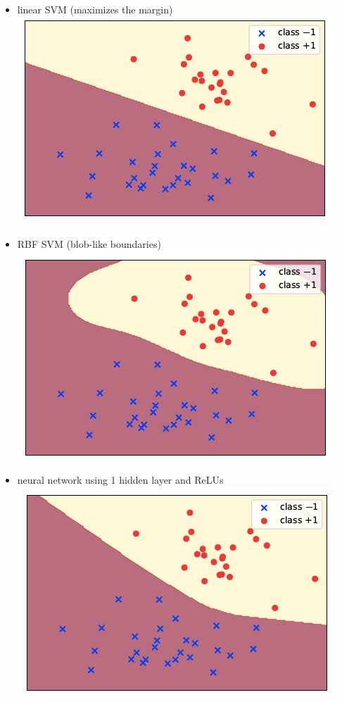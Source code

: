 \documentclass[10pt,landscape,a4paper]{article}
\begin{document}
\begin{multicols*}{5}
\begin{itemize}
    \item linear SVM (maximizes the margin)\\
    \includegraphics[scale=0.3]{linear_svm_plot}
    \item RBF SVM (blob-like boundaries) \\
    \includegraphics[scale=0.3]{rbf_svm_plot}
    \item neural network using 1 hidden layer and ReLUs \\
    \includegraphics[scale=0.3]{neural_network_plot}

\end{itemize}
\end{multicols*}
\end{document}
